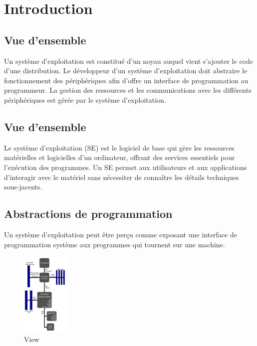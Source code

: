 \section{Introduction}\label{sec:introduction}
\subsection{Vue d'ensemble}

Un système d'exploitation est constitué d'un noyau auquel vient s'ajouter le code d'une distribution.
Le développeur d'un système d'exploitation doit abstraire le fonctionnement des périphériques afin d'offre un interface de programmation au programmeur.
La gestion des ressources et les communications avec les différents périphériques est gérée par le système d'exploitation.

\subsection{Vue d'ensemble}
Le système d'exploitation (SE) est le logiciel de base qui gère les ressources matérielles et logicielles d'un ordinateur, offrant des services essentiels pour l'exécution des programmes. 
Un SE permet aux utilisateurs et aux applications d'interagir avec le matériel sans nécessiter de connaître les détails techniques sous-jacents.

\subsection{Abstractions de programmation}

Un système d’exploitation peut être perçu comme exposant une interface de programmation système aux programmes qui tournent sur une machine.

\begin{figure}[h!]
    \centering
    \includegraphics[width=0.2\textwidth]{Images/View/view.png}
    \caption{View}
    \label{fig:myimage}
  \end{figure}
  

